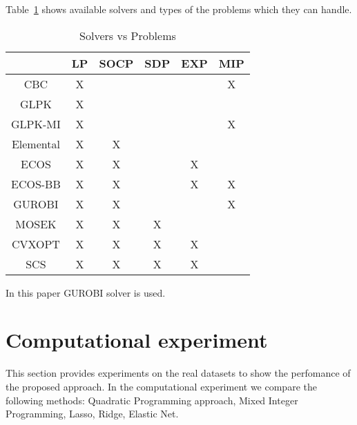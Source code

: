 \documentclass[a4paper,12pt]{article}
\theoremstyle{plain} %
\theoremstyle{definition} %
\theoremstyle{remark} %
\begin{document}
	Table~\ref{tab::solvers} shows available solvers and types of the problems which they can handle.
	\begin{table}[h]
		\centering
		\caption{Solvers vs Problems}
		\label{tab::solvers}
		\begin{tabular}{|c|c|c|c|c|c|}
			\hline
			& LP & SOCP & SDP & EXP & MIP \\
			\hline
			CBC       & X  &      &     &     & X   \\
			\hline
			GLPK      & X  &      &     &     &     \\
			\hline
			GLPK-MI   & X  &      &     &     & X   \\
			\hline
			Elemental & X  & X    &     &     &     \\
			\hline
			ECOS      & X  & X    &     & X   &     \\
			\hline
			ECOS-BB   & X  & X    &     & X   & X   \\
			\hline
			GUROBI    & X  & X    &     &     & X   \\
			\hline
			MOSEK     & X  & X    & X   &     &     \\
			\hline
			CVXOPT    & X  & X    & X   & X   &     \\
			\hline
			SCS       & X  & X    & X   & X   &    \\
			\hline
		\end{tabular}
	\end{table}

	In this paper GUROBI solver is used.
	
	\section*{Computational experiment}
	This section provides experiments on the real datasets to show the perfomance of the proposed approach. In the computational experiment we compare the following methods: Quadratic Programming approach, Mixed Integer Programming, Lasso, Ridge, Elastic Net.

	
\end{document}
